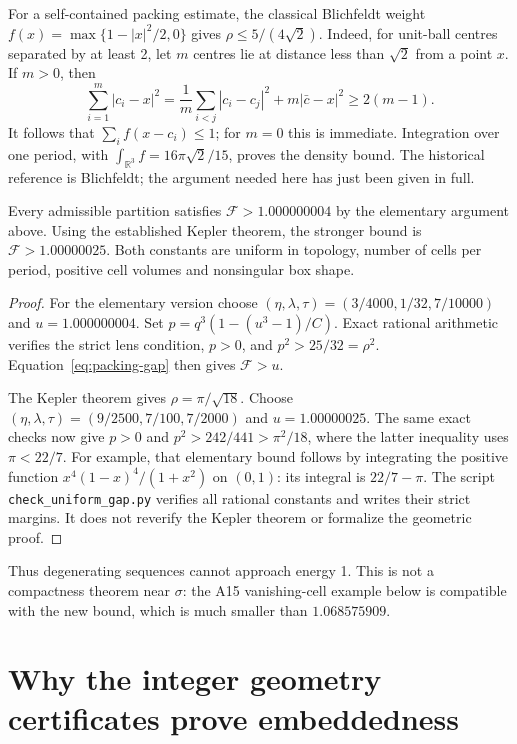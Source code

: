 \documentclass[11pt,a4paper]{report}
\newcommand{\DF}{\mathcal F}
\begin{document}
For a self-contained packing estimate, the classical Blichfeldt weight
$f(x)=\max\{1-|x|^2/2,0\}$ gives $\rho\leq5/(4\sqrt2)$.
Indeed, for unit-ball centres separated by at least 2, let $m$ centres
lie at distance less than $\sqrt2$ from a point $x$. If $m>0$, then
\[
 \sum_{i=1}^m|c_i-x|^2
 =\frac1m\sum_{i<j}|c_i-c_j|^2+m|\bar c-x|^2\geq2(m-1).
\]
It follows that $\sum_i f(x-c_i)\leq1$; for $m=0$ this is immediate.
Integration over one period, with
$\int_{\mathbb R^3}f=16\pi\sqrt2/15$, proves the density bound.
The historical reference is Blichfeldt\autocite{Blichfeldt1929}; the
argument needed here has just been given in full.

\begin{theorem}\label{thm:uniform-gap}
Every admissible partition satisfies $\DF>1.000000004$ by the elementary
argument above. Using the established Kepler theorem, the stronger bound
is $\DF>1.00000025$. Both constants are uniform in topology, number of
cells per period, positive cell volumes and nonsingular box shape.
\end{theorem}
\begin{proof}
For the elementary version choose
$(\eta,\lambda,\tau)=(3/4000,1/32,7/10000)$ and
$u=1.000000004$. Set $p=q^3(1-(u^3-1)/C)$.
Exact rational arithmetic verifies the strict lens condition, $p>0$,
and $p^2>25/32=\rho^2$. Equation~\eqref{eq:packing-gap} then gives
$\DF>u$.

The Kepler theorem\autocite{Hales2017} gives
$\rho=\pi/\sqrt{18}$. Choose
$(\eta,\lambda,\tau)=(9/2500,7/100,7/2000)$ and $u=1.00000025$.
The same exact checks now give $p>0$ and $p^2>242/441>\pi^2/18$,
where the latter inequality uses $\pi<22/7$.
For example, that elementary bound follows by integrating the positive
function $x^4(1-x)^4/(1+x^2)$ on $(0,1)$: its integral is $22/7-\pi$.
The script \texttt{check\_uniform\_gap.py} verifies all rational constants
and writes their strict margins. It does not reverify the Kepler theorem
or formalize the geometric proof.
\end{proof}

Thus degenerating sequences cannot approach energy 1. This is not a
compactness theorem near $\sigma$: the A15 vanishing-cell example below
is compatible with the new bound, which is much smaller than $1.068575909$.

\section{Why the integer geometry certificates prove embeddedness}
\end{document}
